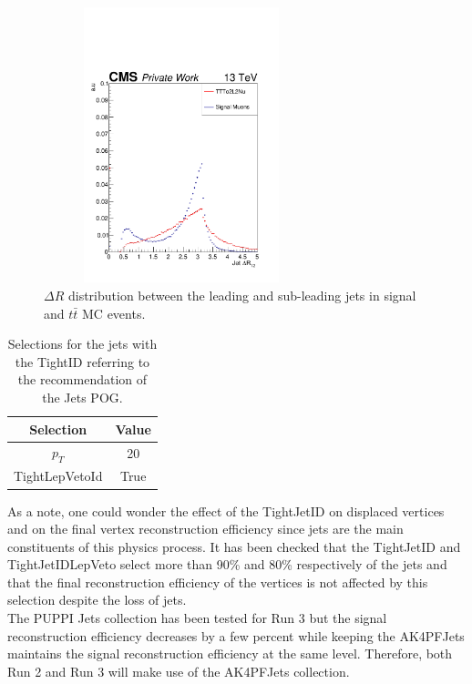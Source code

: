 \documentclass{cernatlasnote}
\begin{document}
\begin{figure}[ht]
\centering
\includegraphics[height=8cm, width=8cm, trim= 0cm 0cm 0cm 0.cm,clip]{images/Jet/JetJetdR.pdf}
\caption{\label{fig:JetdR}  $\Delta R$ distribution between the leading and sub-leading jets in signal and $t\bar{t}$ MC events.}
\end{figure}
\FloatBarrier

\begin{table}[h]
\centering
\begin{tabular}{|c|c|}
  \hline
  \rowcolor{lightgray} 
  Selection & Value \\
  \hline
  $p_T$ & 20 \\
  TightLepVetoId & True \\
  \hline
\end{tabular}
    \caption{Selections for the jets with the TightID referring to the recommendation of the Jets POG\cite{TIGHTJET}.}
    \label{tab:JETSEL}
\end{table}

 As a note, one could wonder the effect of the TightJetID on displaced vertices and on the final vertex reconstruction efficiency since jets are the main constituents of this physics process. It has been checked that the TightJetID and TightJetIDLepVeto select more than 90\% and 80\% respectively of the jets and that the final reconstruction efficiency of the vertices is not affected by this selection despite the loss of jets. \\

 The PUPPI Jets collection has been tested for Run 3 but the signal reconstruction efficiency decreases by a few percent while keeping the AK4PFJets maintains the signal reconstruction efficiency at the same level. Therefore, both Run 2 and Run 3 will make use of the AK4PFJets collection.
\end{document}
